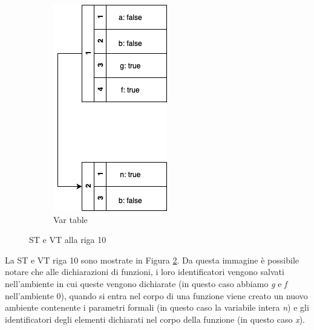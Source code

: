 \begin{figure}[h]
\begin{subfigure}{.23\textwidth}
  \includegraphics[width=1\linewidth]{Images/VT_example1.png}
  \caption{Var table}
  \label{fig:VTexample}
\end{subfigure}
\caption{ST e VT alla riga 10}
\label{fig:example}
\end{figure}

La ST e VT riga 10 sono mostrate in Figura \ref{fig:example}. Da questa immagine è possibile notare che alle dichiarazioni di funzioni, i loro identificatori vengono salvati nell'ambiente in cui queste vengono dichiarate (in questo caso abbiamo \textit{g} e \textit{f} nell'ambiente 0), quando si entra nel corpo di una funzione viene creato un nuovo ambiente contenente i parametri formali (in questo caso la variabile intera \textit{n}) e gli identificatori degli elementi dichiarati nel corpo della funzione (in questo caso \textit{x}). 


